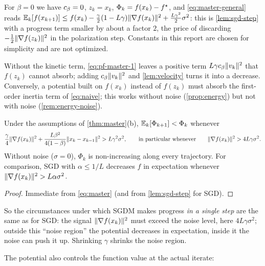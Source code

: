 \begin{remark}[The case $\beta=0$]
For $\beta=0$ we have $c_\beta=0$, $z_k=x_k$, $\Phi_k=f(x_k)-f^\star$, and
\eqref{eq:master-general} reads
$\mathbb{E}_k[f(x_{k+1})]\le f(x_k)-\frac\gamma2(1-L\gamma)\lVert \nabla f(x_k)\rVert^2+\frac{L\gamma^2}{2}\sigma^2$:
this is \cref{lem:sgd-step} with a progress term smaller by about a factor $2$, the price of
discarding $-\frac12\lVert \nabla f(z_k)\rVert^2$ in the polarization step. Constants in this
report are chosen for simplicity and are not optimized.
\end{remark}

\begin{remark}
Without the kinetic term, \eqref{eq:pf-master-1} leaves a positive term
$L\gamma c_\beta\lVert v_k\rVert^2$ that $f(z_k)$ cannot absorb; adding $c_\beta\lVert v_k\rVert^2$ and
\cref{lem:velocity} turns it into a decrease. Conversely, a potential built on $f(x_k)$
instead of $f(z_k)$ must absorb the first-order inertia term of \eqref{eq:naive}; this works
without noise (\cref{prop:energy}) but not with noise (\cref{rem:energy-noise}).
\end{remark}

\begin{corollary}\label{cor:when-decrease}
Under the assumptions of \cref{thm:master}(b), $\mathbb{E}_k[\Phi_{k+1}]<\Phi_k$ whenever
\[
  \frac\gamma4\lVert \nabla f(x_k)\rVert^2+\frac{L\beta^2}{4(1-\beta)}\lVert x_k-x_{k-1}\rVert^2>L\gamma^2\sigma^2,
  \qquad\text{in particular whenever}\qquad \lVert \nabla f(x_k)\rVert^2>4L\gamma\sigma^2 .
\]
Without noise ($\sigma=0$), $\Phi_k$ is non-increasing along every trajectory.
For comparison, SGD with $\alpha\le1/L$ decreases $f$ in expectation whenever
$\lVert \nabla f(x_k)\rVert^2>L\alpha\sigma^2$.
\end{corollary}

\begin{proof}
Immediate from \eqref{eq:master} (and from \cref{lem:sgd-step} for SGD).
\end{proof}

So the circumstances under which SGDM makes progress \emph{in a single step} are the same
as for SGD: the signal $\lVert \nabla f(x_k)\rVert^2$ must exceed the noise level, here
$4L\gamma\sigma^2$; outside this ``noise region'' the potential decreases in expectation,
inside it the noise can push it up. Shrinking $\gamma$ shrinks the noise region.

The potential also controls the function value at the actual iterate:

